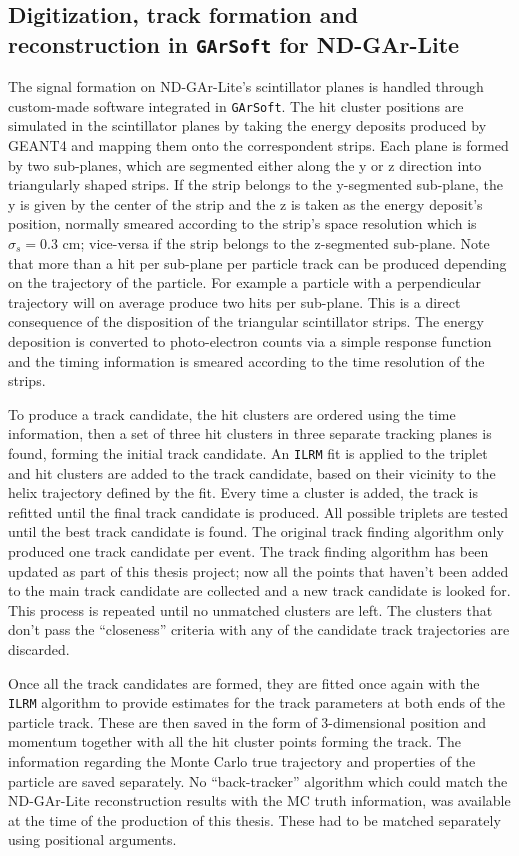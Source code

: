\subsection{Digitization, track formation and reconstruction in \texttt{GArSoft} for ND-GAr-Lite}
The signal formation on ND-GAr-Lite's scintillator planes is handled through custom-made software integrated in \texttt{GArSoft}. The hit cluster positions are simulated in the scintillator planes by taking the energy
deposits produced by GEANT4 and mapping them onto the correspondent strips. Each plane is formed by two sub-planes, which are segmented either along the y or z direction into triangularly shaped strips. If the strip belongs to the y-segmented sub-plane, the y is given by the center of the strip and the z is taken as the energy deposit’s position, normally smeared according to the strip’s space resolution which is $\sigma_s = 0.3$ cm; vice-versa if the strip belongs to the z-segmented sub-plane. Note that more than a hit per sub-plane per particle track can be produced depending on the trajectory of the particle. For example a particle with a perpendicular trajectory will on average produce two hits per sub-plane. This is a direct consequence of the disposition of the triangular scintillator strips. The energy deposition is converted to photo-electron counts via a simple response function and the timing information is smeared according to the time resolution of the strips. 

To produce a track candidate, the hit clusters are ordered using the time information, then a set of three hit clusters in three separate tracking planes is found, forming the initial track candidate. An \texttt{ILRM} fit is applied to the triplet and hit clusters are added to the track candidate, based on their vicinity to the helix trajectory defined by the fit. Every time a cluster is added, the track is refitted until the final track candidate is produced. All possible triplets are tested until the best track candidate is found. The original track finding algorithm only produced one track candidate per event. The track finding algorithm has been updated as part of this thesis project; now all the points that haven't been added to the main track candidate are collected and a new track candidate is looked for. This process is repeated until no unmatched clusters are left. The clusters that don't pass the \enquote{closeness} criteria with any of the candidate track trajectories are discarded.

Once all the track candidates are formed, they are fitted once again with the \texttt{ILRM} algorithm to provide estimates for the track parameters at both ends of the particle track. These are then saved in the form of 3-dimensional position and momentum together with all the hit cluster points forming the track. The information regarding the Monte Carlo true trajectory and properties of the particle are saved separately. No \enquote{back-tracker} algorithm which could match the ND-GAr-Lite reconstruction results with the MC truth information, was available at the time of the production of this thesis. These had to be matched separately using positional arguments. 

